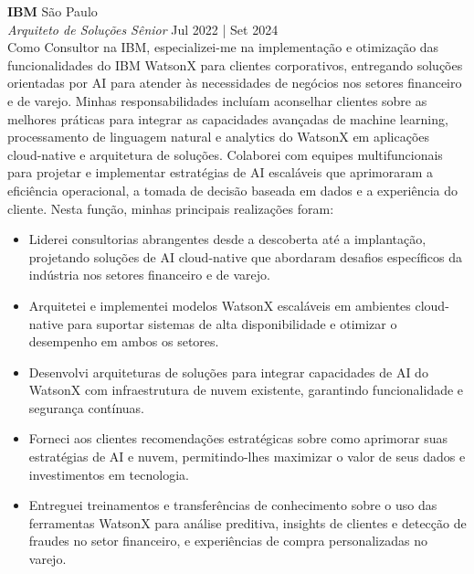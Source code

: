 \documentclass[a4paper]{article}
\begin{document}
\textbf{IBM}                                                      \hfill São Paulo              \\
\textit{Arquiteto de Soluções Sênior}                              
\hfill Jul 2022 |
Set 2024    \\
\vspace{1mm}
Como Consultor na IBM, especializei-me na implementação e otimização das funcionalidades do IBM WatsonX para clientes corporativos, entregando soluções orientadas por AI para atender às necessidades de negócios nos setores financeiro e de varejo. 
Minhas responsabilidades incluíam aconselhar clientes sobre as melhores práticas para integrar as capacidades avançadas de machine learning, processamento de linguagem natural e analytics do WatsonX em aplicações cloud-native e arquitetura de soluções. 
Colaborei com equipes multifuncionais para projetar e implementar estratégias de AI escaláveis que aprimoraram a eficiência operacional, a tomada de decisão baseada em dados e a experiência do cliente. 
\newline
Nesta função, minhas principais realizações foram:
\vspace{-2mm}
\begin{itemize}
\setlength\itemsep{-1mm}
\item Liderei consultorias abrangentes desde a descoberta até a implantação, projetando soluções de AI cloud-native que abordaram desafios específicos da indústria nos setores financeiro e de varejo. 
\item Arquitetei e implementei modelos WatsonX escaláveis em ambientes cloud-native para suportar sistemas de alta disponibilidade e otimizar o desempenho em ambos os setores. 
\item Desenvolvi arquiteturas de soluções para integrar capacidades de AI do WatsonX com infraestrutura de nuvem existente, garantindo funcionalidade e segurança contínuas. 
\item Forneci aos clientes recomendações estratégicas sobre como aprimorar suas estratégias de AI e nuvem, permitindo-lhes maximizar o valor de seus dados e investimentos em tecnologia. 
\item Entreguei treinamentos e transferências de conhecimento sobre o uso das ferramentas WatsonX para análise preditiva, insights de clientes e detecção de fraudes no setor financeiro, e experiências de compra personalizadas no varejo. 
\end{itemize}
\vspace{-1mm}
\end{document}
